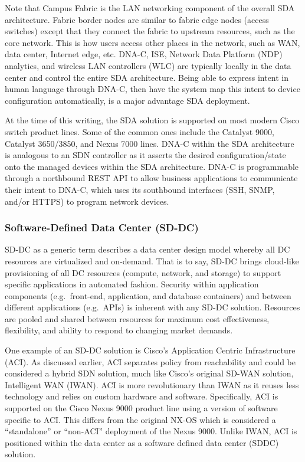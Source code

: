 Note that Campus Fabric is the LAN networking component of the overall SDA
architecture. Fabric border nodes are similar to fabric edge nodes (access
switches) except that they connect the fabric to upstream resources, such as
the core network. This is how users access other places in the network, such
as WAN, data center, Internet edge, etc. DNA-C, ISE, Network Data Platform
(NDP) analytics, and wireless LAN controllers (WLC) are typically locally in
the data center and control the entire SDA architecture. Being able to express
intent in human language through DNA-C, then have the system map this intent
to device configuration automatically, is a major advantage SDA deployment.

At the time of this writing, the SDA solution is supported on most modern
Cisco switch product lines. Some of the common ones include the Catalyst 9000,
Catalyst 3650/3850, and Nexus 7000 lines. DNA-C within the SDA architecture is
analogous to an SDN controller as it asserts the desired configuration/state
onto the managed devices within the SDA architecture. DNA-C is programmable
through a northbound REST API to allow business applications to communicate
their intent to DNA-C, which uses its southbound interfaces (SSH, SNMP, and/or
HTTPS) to program network devices.

\subsubsection{Software-Defined Data Center (SD-DC)}
SD-DC as a generic term describes a data center design model whereby all DC
resources are virtualized and on-demand. That is to say, SD-DC brings
cloud-like provisioning of all DC resources (compute, network, and storage) to
support specific applications in automated fashion. Security within
application components (e.g.\ front-end, application, and database containers)
and between different applications (e.g.\ APIs) is inherent with any SD-DC
solution. Resources are pooled and shared between resources for maximum cost
effectiveness, flexibility, and ability to respond to changing market demands.

One example of an SD-DC solution is Cisco's Application Centric Infrastructure
(ACI). As discussed earlier, ACI separates policy from reachability and could
be considered a hybrid SDN solution, much like Cisco's original SD-WAN
solution, Intelligent WAN (IWAN). ACI is more revolutionary than IWAN as it
reuses less technology and relies on custom hardware and software.
Specifically, ACI is supported on the Cisco Nexus 9000 product line using a
version of software specific to ACI\@. This differs from the original NX-OS
which is considered a ``standalone'' or ``non-ACI'' deployment of the Nexus 9000.
Unlike IWAN, ACI is positioned within the data center as a software defined
data center (SDDC) solution.

